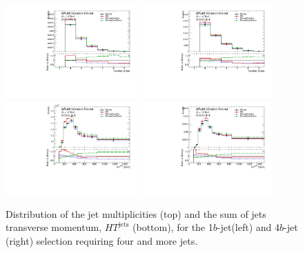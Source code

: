 \begin{figure}[!htb]
\centering
\includegraphics[width=0.45\textwidth]{Plots/ttV/c_Region_0_nJets}
\includegraphics[width=0.45\textwidth]{Plots/ttV/c_Region_1_nJets}\\
\includegraphics[width=0.45\textwidth]{Plots/ttV/c_Region_0_HT_jets}
\includegraphics[width=0.45\textwidth]{Plots/ttV/c_Region_1_HT_jets}\\
  \caption{Distribution of the jet multiplicities (top) and the sum of jets transverse momentum, $HT^{\text{jets}}$ (bottom), for the 1$b$-jet(left) and 4$b$-jet (right) selection requiring four and more jets. \label{ttbb:avedR}}
\end{figure}


